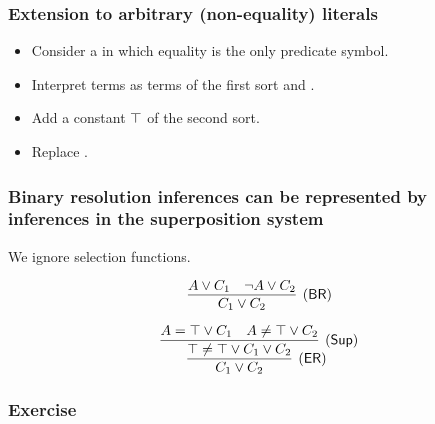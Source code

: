                                 


         \begin{frame}\frametitle{Extension to arbitrary (non-equality) literals}

\begin{itemize}
\item Consider a  in which equality is the only predicate
symbol.

\item Interpret terms as terms of the first sort and .

\item Add a \alert{constant $\top$ of the second sort}.

\item Replace .
\end{itemize}


                     \end{frame}


             \begin{frame}\frametitle{Binary resolution inferences can be
                 represented by inferences in the superposition system}

We ignore selection functions.

  \[\M{
      \infer[(\BRr)]{C_1 \orl C_2}{A \orl C_1 & \notl A \orl C_2}}
  \]

  \[\M{
      \infer[(\ruleER)]{
        C_1 \orl C_2
        }{
        \infer[(\ruleSup)]{
          \top \neql \top \orl C_1 \orl C_2
          }{
          A \eql \top \orl C_1 & A \neql \top \orl C_2
        }
      }
  }\]

                     \end{frame}


             \begin{frame}\frametitle{Exercise}


                     \end{frame}

    

